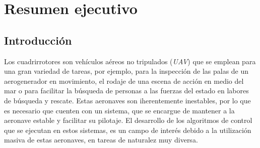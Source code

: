 \chapter*{Resumen ejecutivo}
\section*{Introducción}
Los cuadrirrotores son vehículos aéreos no tripulados (\textit{UAV}) que se emplean para una gran variedad de tareas, por ejemplo, para la inspección de las palas de un aerogenerador en movimiento, el rodaje de una escena de acción en medio del mar o para facilitar la búsqueda de personas a las fuerzas del estado en labores de búsqueda y rescate. Estas aeronaves son iherentemente inestables, por lo que es necesario que cuenten con un sistema, que se encargue de mantener a la aeronave estable y facilitar su pilotaje. El desarrollo de los algoritmos de control que se ejecutan en estos sistemas, es un campo de interés debido a la utilización masiva de estas aeronaves, en tareas de naturalez muy diversa.

\newpage